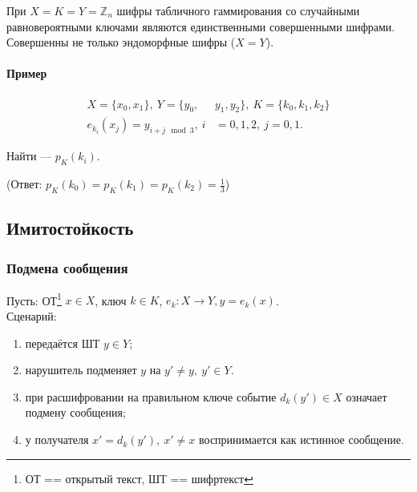 \documentclass[a4paper,12pt]{article}
\begin{document}
При $X = K = Y = \mathbb{Z}_n$ шифры табличного гаммирования со случайными равновероятными ключами являются единственными совершенными шифрами.\\

Совершенны не только эндоморфные шифры ($X =Y$).

\paragraph{Пример}

$$\begin{aligned}
	X = \{x_0, x_1\}, ~ Y = \{y_0,&y_1,y_2\}, ~ K= \{k_0, k_1, k_2\} \\
	e_{k_i}(x_j) = y_{i + j \mod 3}, ~i &= 0,1,2,~ j=0,1.	
\end{aligned}$$

Найти --- $p_K(k_i)$.

(Ответ: $p_K(k_0) = p_K(k_1) = p_K(k_2) = \frac{1}{3}$)

\subsection{Имитостойкость}



\subsubsection{Подмена сообщения}
Пусть: ОТ\footnote{ОТ == открытый текст, ШТ == шифртекст} $x \in X$, ключ $k \in K$, $e_k: X\rightarrow Y, y = e_k(x)$. \\

Сценарий:
\begin{enumerate}
	\item передаётся ШТ $y\in Y$;
	\item нарушитель подменяет $y$ на $y' \ne y,~ y' \in Y.$
	\item при расшифровании на правильном ключе событие $d_k(y') \in X$ означает подмену сообщения;
	\item у получателя $x' = d_k(y'), ~ x'\ne x$ воспринимается как истинное сообщение.
\end{enumerate}
\end{document}
